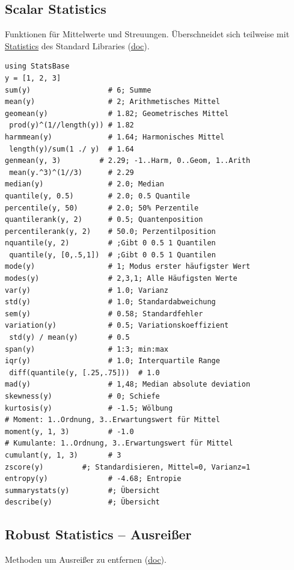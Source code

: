 \documentclass[10pt,twocolumn]{scrartcl}
\begin{document}
\subsection{Scalar Statistics}
\label{ssec:StatsBase_ScalarStatistics}

Funktionen für Mittelwerte und Streuungen. Überschneidet sich teilweise mit
\hyperref[ssec:standardLibrary_Statistics]{Statistics} des Standard Libraries
(\href{https://juliastats.org/StatsBase.jl/stable/scalarstats/}{doc}).

\begin{lstlisting}
using StatsBase
y = [1, 2, 3]
sum(y)                  # 6; Summe
mean(y)                 # 2; Arithmetisches Mittel
geomean(y)              # 1.82; Geometrisches Mittel
 prod(y)^(1//length(y)) # 1.82
harmmean(y)             # 1.64; Harmonisches Mittel
 length(y)/sum(1 ./ y)  # 1.64
genmean(y, 3)         # 2.29; -1..Harm, 0..Geom, 1..Arith
 mean(y.^3)^(1//3)      # 2.29
median(y)               # 2.0; Median
quantile(y, 0.5)        # 2.0; 0.5 Quantile
percentile(y, 50)       # 2.0; 50% Perzentile
quantilerank(y, 2)      # 0.5; Quantenposition
percentilerank(y, 2)    # 50.0; Perzentilposition
nquantile(y, 2)         # ;Gibt 0 0.5 1 Quantilen
 quantile(y, [0,.5,1])  # ;Gibt 0 0.5 1 Quantilen
mode(y)                 # 1; Modus erster häufigster Wert
modes(y)                # 2,3,1; Alle Häufigsten Werte
var(y)                  # 1.0; Varianz
std(y)                  # 1.0; Standardabweichung
sem(y)                  # 0.58; Standardfehler
variation(y)            # 0.5; Variationskoeffizient
 std(y) / mean(y)       # 0.5
span(y)                 # 1:3; min:max
iqr(y)                  # 1.0; Interquartile Range
 diff(quantile(y, [.25,.75]))  # 1.0
mad(y)                  # 1,48; Median absolute deviation
skewness(y)             # 0; Schiefe
kurtosis(y)             # -1.5; Wölbung
# Moment: 1..Ordnung, 3..Erwartungswert für Mittel
moment(y, 1, 3)         # -1.0
# Kumulante: 1..Ordnung, 3..Erwartungswert für Mittel
cumulant(y, 1, 3)       # 3
zscore(y)         #; Standardisieren, Mittel=0, Varianz=1
entropy(y)              # -4.68; Entropie
summarystats(y)         #; Übersicht
describe(y)             #; Übersicht
\end{lstlisting}

\subsection{Robust Statistics -- Ausreißer}

Methoden um Ausreißer zu entfernen
(\href{https://juliastats.org/StatsBase.jl/stable/robust/}{doc}).
\end{document}
